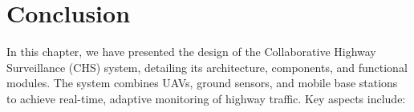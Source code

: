 








\section{Conclusion}

In this chapter, we have presented the design of the Collaborative Highway Surveillance (CHS) system, detailing its architecture, components, and functional modules. The system combines UAVs, ground sensors, and mobile base stations to achieve real-time, adaptive monitoring of highway traffic. Key aspects include:

